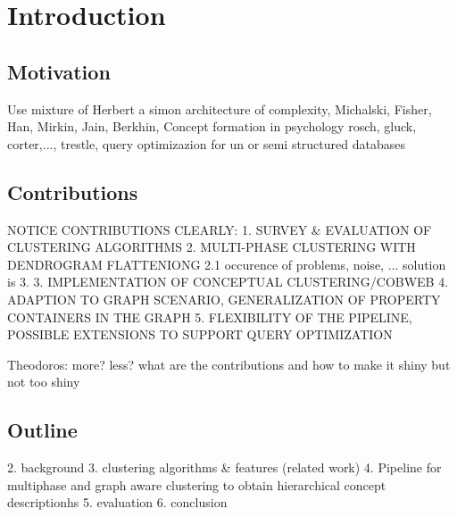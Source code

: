 \chapter{Introduction}
\section{Motivation}
Use mixture of Herbert a simon architecture of complexity, Michalski, Fisher, Han, Mirkin, Jain, Berkhin, Concept formation in psychology rosch, gluck, corter,..., trestle, query optimizazion for un or semi structured databases

\section{Contributions}
NOTICE CONTRIBUTIONS CLEARLY: 
1. SURVEY \& EVALUATION OF CLUSTERING ALGORITHMS
2. MULTI-PHASE CLUSTERING WITH DENDROGRAM FLATTENIONG
2.1 occurence of problems, noise, ... solution is 3.
3. IMPLEMENTATION OF CONCEPTUAL CLUSTERING/COBWEB
4. ADAPTION TO GRAPH SCENARIO, GENERALIZATION OF PROPERTY CONTAINERS IN THE GRAPH
5. FLEXIBILITY OF THE PIPELINE, POSSIBLE EXTENSIONS TO SUPPORT QUERY OPTIMIZATION 

Theodoros: more? less? what are the contributions and how to make it shiny but not too shiny
\section{Outline}
2. background
3. clustering algorithms \& features  (related work)
4. Pipeline for multiphase and graph aware clustering to obtain hierarchical concept descriptionhs
5. evaluation
6. conclusion